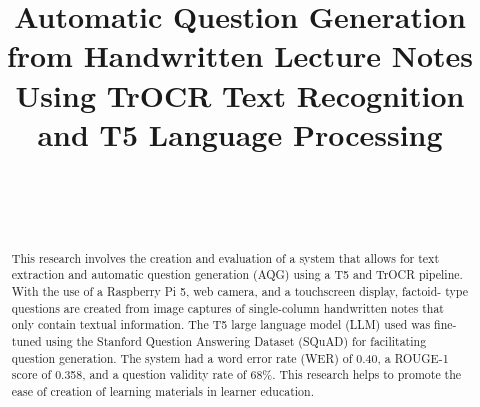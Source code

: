 \documentclass[conference]{IEEEtran}
\begin{document}
\title{Automatic Question Generation from Handwritten Lecture Notes Using TrOCR Text Recognition 
and T5 Language Processing}
\author{
~\\
\and
{}
~\\
\and
{}
}


\maketitle

\begin{abstract}
    This research involves the creation and evaluation of a system that allows 
    for text extraction and automatic question generation (AQG) using a 
    T5 and TrOCR pipeline. With the use of a Raspberry Pi 5, web camera, and a touchscreen display, factoid-
    type questions are created from image captures of single-column handwritten notes that only contain textual information. The 
    T5 large language model (LLM) used was fine-tuned using the 
    Stanford Question Answering Dataset (SQuAD) for facilitating question 
    generation. The system had a word error rate (WER) of 
    0.40, a ROUGE-1 score of 0.358, and a question validity rate of 
    68\%.
    This research helps to promote the ease of creation of 
    learning materials in learner education.
\end{abstract}
\end{document}
